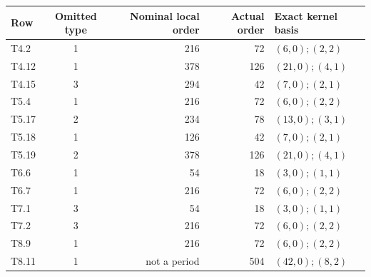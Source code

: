 \begin{longtable}{lcrrl}
\toprule Row&Omitted type&Nominal local order&Actual order&Exact kernel basis\\\midrule\endhead
T4.2 & 1 & 216 & 72 & $(6,0);(2,2)$ \\
T4.12 & 1 & 378 & 126 & $(21,0);(4,1)$ \\
T4.15 & 3 & 294 & 42 & $(7,0);(2,1)$ \\
T5.4 & 1 & 216 & 72 & $(6,0);(2,2)$ \\
T5.17 & 2 & 234 & 78 & $(13,0);(3,1)$ \\
T5.18 & 1 & 126 & 42 & $(7,0);(2,1)$ \\
T5.19 & 2 & 378 & 126 & $(21,0);(4,1)$ \\
T6.6 & 1 & 54 & 18 & $(3,0);(1,1)$ \\
T6.7 & 1 & 216 & 72 & $(6,0);(2,2)$ \\
T7.1 & 3 & 54 & 18 & $(3,0);(1,1)$ \\
T7.2 & 3 & 216 & 72 & $(6,0);(2,2)$ \\
T8.9 & 1 & 216 & 72 & $(6,0);(2,2)$ \\
T8.11 & 1 & not a period & 504 & $(42,0);(8,2)$ \\
\bottomrule\end{longtable}
